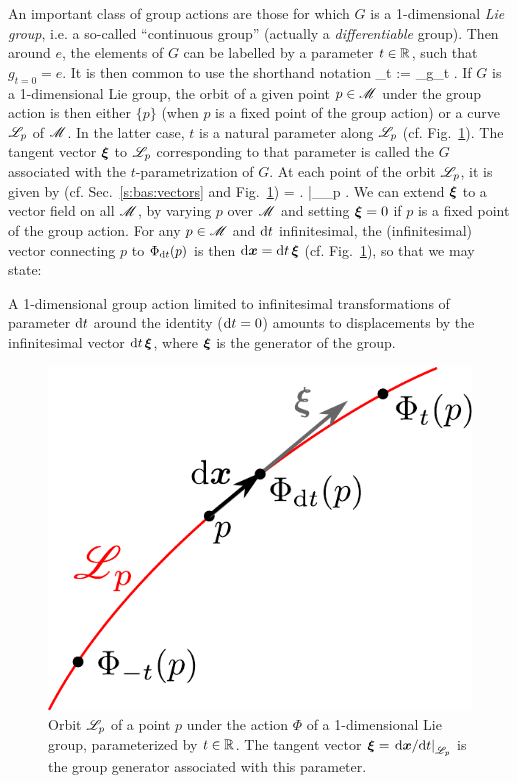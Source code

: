 An important class of group actions are those for which $G$ is a 1-dimensional
\emph{Lie group}, i.e. a so-called ``continuous group'' (actually a \emph{differentiable} group).
Then around $e$, the elements of $G$ can be labelled by a parameter $t\in \mathbb{R}$, such that $g_{t=0} = e$. It is then
common to use the shorthand notation
\be
        \Phi_t := \Phi_{g_t} .
\ee
If $G$ is a 1-dimensional Lie group, the orbit of a given point $p\in\mathscr{M}$ under the group action is then either $\{p\}$ (when $p$ is a fixed point of the
group action) or a curve $\mathscr{L}_p$ of $\mathscr{M}$. In the latter case,
$t$ is a natural parameter along $\mathscr{L}_p$ (cf. Fig.~\ref{f:neh:orbit_group}). The tangent vector $\bm{\xi}$ to $\mathscr{L}_p$
corresponding to that parameter is called the  $G$
associated with the $t$-parametrization of $G$. At each point of
the orbit $\mathscr{L}_p$, it is given by
(cf. Sec.~\ref{s:bas:vectors} and Fig.~\ref{f:neh:orbit_group})
\be \label{e:neh:xi_dxdt}
    \w{\xi} = \left.  \right|_{\Li_p} .
\ee
We can extend $\bm{\xi}$ to a vector field on all $\mathscr{M}$, by varying $p$
over $\mathscr{M}$ and setting $\bm{\xi} = 0$ if $p$ is a fixed point
of the group action.
For any $p\in\mathscr{M}$ and $\mathrm{d} t$ infinitesimal, the (infinitesimal)
vector connecting $p$ to $\Phi_{\mathrm{d} t}(p)$ is then $\mathrm{d}\bm{x} = \mathrm{d} t \, \bm{\xi}$
(cf. Fig.~\ref{f:neh:orbit_group}), so that we may state:
\begin{prop}
A 1-dimensional group action limited to infinitesimal transformations of parameter
$\mathrm{d} t$ around the identity ($\mathrm{d} t =0$) amounts to displacements by the infinitesimal vector $\mathrm{d} t\, \bm{\xi}$, where $\bm{\xi}$ is the generator of the group.
\end{prop}

\begin{figure}
\centerline{\includegraphics[height=0.25\textheight]{def_orbit_group.pdf}}
\caption[]{\label{f:neh:orbit_group} \footnotesize
Orbit $\mathscr{L}_p$ of a point $p$ under the action $\Phi$ of a 1-dimensional Lie group, parameterized
by $t\in\mathbb{R}$. The tangent vector $\bm{\xi} = \left. \mathrm{d}\bm{x}/\mathrm{d} t \right| _{\mathscr{L}_p}$ is the group
generator associated with this parameter.}
\end{figure}

